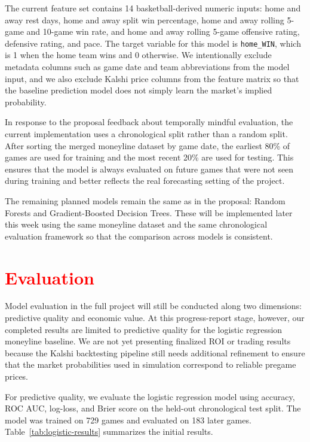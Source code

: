 \documentclass[sigconf]{acmart}
\begin{document}
The current feature set contains 14 basketball-derived numeric inputs: home and away rest days, home and away split win percentage, home and away rolling 5-game and 10-game win rate, and home and away rolling 5-game offensive rating, defensive rating, and pace. The target variable for this model is \texttt{home\_WIN}, which is 1 when the home team wins and 0 otherwise. We intentionally exclude metadata columns such as game date and team abbreviations from the model input, and we also exclude Kalshi price columns from the feature matrix so that the baseline prediction model does not simply learn the market's implied probability.

In response to the proposal feedback about temporally mindful evaluation, the current implementation uses a chronological split rather than a random split. After sorting the merged moneyline dataset by game date, the earliest 80\% of games are used for training and the most recent 20\% are used for testing. This ensures that the model is always evaluated on future games that were not seen during training and better reflects the real forecasting setting of the project.

The remaining planned models remain the same as in the proposal: Random Forests and Gradient-Boosted Decision Trees. These will be implemented later this week using the same moneyline dataset and the same chronological evaluation framework so that the comparison across models is consistent.

\section{\textcolor{red}{Evaluation}}
Model evaluation in the full project will still be conducted along two dimensions: predictive quality and economic value. At this progress-report stage, however, our completed results are limited to predictive quality for the logistic regression moneyline baseline. We are not yet presenting finalized ROI or trading results because the Kalshi backtesting pipeline still needs additional refinement to ensure that the market probabilities used in simulation correspond to reliable pregame prices.

For predictive quality, we evaluate the logistic regression model using accuracy, ROC AUC, log-loss, and Brier score on the held-out chronological test split. The model was trained on 729 games and evaluated on 183 later games. Table~\ref{tab:logistic-results} summarizes the initial results.
\end{document}
